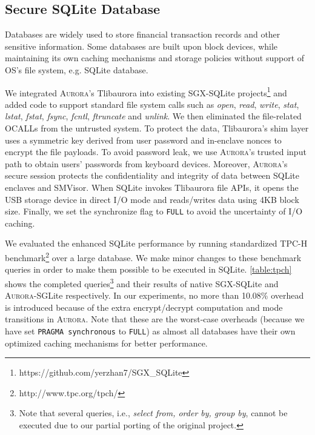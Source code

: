 \documentclass[journal,twocolumn,letterpaper,10pt]{IEEEtran}
\begin{document}
\subsection{Secure SQLite Database}
Databases are widely used to store financial transaction records and other sensitive information. Some databases are built upon block devices, while maintaining its own caching mechanisms and storage policies without support of OS's file system, e.g. SQLite database.

We integrated \textsc{Aurora}'s Tlibaurora into existing SGX-SQLite projects\footnote{https://github.com/yerzhan7/SGX\_SQLite} and added code to support standard file system calls such as \textit{open}, \textit{read}, \textit{write}, \textit{stat}, \textit{lstat}, \textit{fstat}, \textit{fsync}, \textit{fcntl}, \textit{ftruncate} and \textit{unlink}. We then eliminated the file-related OCALLs from the untrusted system. 
To protect the data, Tlibaurora's shim layer uses a symmetric key derived from user password and in-enclave nonces to encrypt the file payloads. %
To avoid password leak, we use \textsc{Aurora}'s trusted input path to obtain users' passwords from keyboard devices. Moreover, \textsc{Aurora}'s secure session protects the confidentiality and integrity of data between SQLite enclaves and SMVisor.
When SQLite invokes Tlibaurora file APIs, it opens the USB storage device in direct I/O mode and reads/writes data using 4KB block size. 
Finally, %
we set the synchronize flag to \texttt{FULL} to avoid the uncertainty of I/O caching.

We evaluated the enhanced SQLite performance by running standardized TPC-H benchmark\footnote{http://www.tpc.org/tpch/} over a large database. %
We make minor changes to these benchmark queries in order to make them possible to be executed in SQLite. 
\autoref{table:tpch} shows the completed queries\footnote{Note that several queries, i.e., \textit{select from, order by, group by}, cannot be executed due to our partial porting of the original project.} and their results of native SGX-SQLite and \textsc{Aurora}-SGLite respectively. In our experiments, no more than 10.08\% overhead is introduced because of the extra encrypt/decrypt computation and mode transitions in \textsc{Aurora}.
Note that these are the worst-case overheads (because we have set \texttt{PRAGMA synchronous} to \texttt{FULL}) as almost all databases have their own optimized caching mechanisms for better performance.
\end{document}
